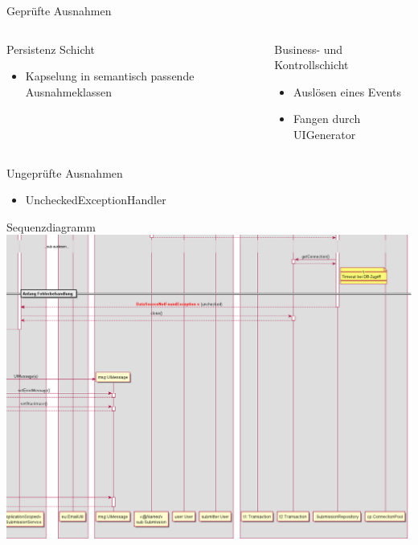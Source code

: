 \documentclass{beamer}
\begin{document}
    \begin{frame}{Geprüfte Ausnahmen}
        \pause
        \begin{columns}
            \begin{column}{.48\textwidth}
                Persistenz Schicht
                \begin{itemize}
                    \item Kapselung in semantisch passende Ausnahmeklassen
                \end{itemize}
            \end{column}
            \pause
            \begin{column}{.48\textwidth}
                Business- und Kontrollschicht
                \begin{itemize}
                    \item Auslösen eines Events
                    \item Fangen durch UIGenerator
                \end{itemize}
            \end{column}
        \end{columns}
    \end{frame}

    \begin{frame}{Ungeprüfte Ausnahmen}
        \begin{itemize}
            \item UncheckedExceptionHandler
        \end{itemize}
    \end{frame}

    \begin{frame}{Sequenzdiagramm}
        \centering
        \includegraphics[height=0.8\textheight]{excerpts/sequence2_1}
    \end{frame}
\end{document}
